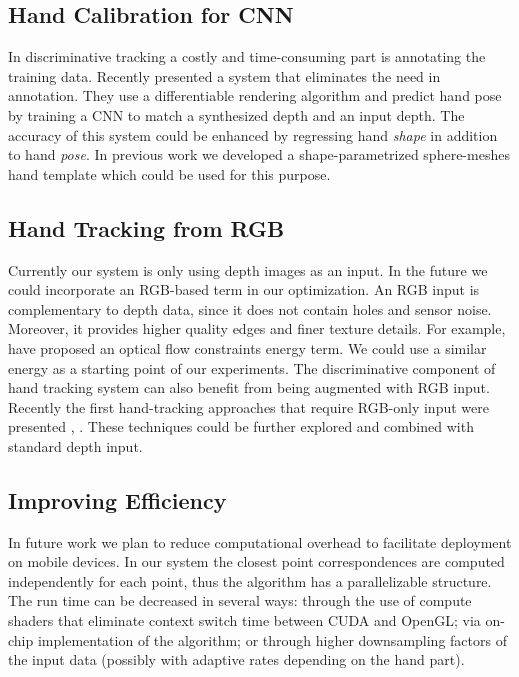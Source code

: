 \subsection*{Hand Calibration for CNN}
In discriminative tracking a costly and time-consuming part is annotating the training data. Recently \cite{ dibra2017refine} presented a system that eliminates the need in annotation. They use a differentiable rendering algorithm and predict hand pose by training a CNN to match a synthesized depth and an input depth. The accuracy of this system could be enhanced by regressing hand \textit{shape} in addition to hand \textit{pose}. In previous work we developed a shape-parametrized sphere-meshes hand template which could be used for this purpose.

\subsection*{Hand Tracking from RGB}
Currently our system is only using depth images as an input. In the future we could incorporate an RGB-based term in our optimization. An RGB input is complementary to depth data, since it does not contain holes and sensor noise. Moreover, it provides higher quality edges and finer texture details. For example, \cite{weise2011realtime} have proposed an optical flow constraints energy term. We could use a similar energy as a starting point of our experiments. The discriminative component of hand tracking system can also benefit from being augmented with RGB input. Recently the first hand-tracking approaches that require RGB-only input were presented \cite{simon2017hand}, \cite{zimmermann2017learning}. These techniques could be further explored and combined with standard depth input.

\subsection*{Improving Efficiency}
In future work we plan to reduce computational overhead to facilitate deployment on mobile devices. In our system the closest point correspondences are computed independently for each point, thus the algorithm has a parallelizable structure. The run time can be decreased in several ways: through the use of compute shaders that eliminate context switch time between CUDA and OpenGL; via on-chip implementation of the algorithm; or through higher downsampling factors of the input data (possibly with adaptive rates depending on the hand part).

